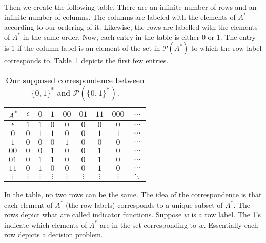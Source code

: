\documentclass{iansnotes}
\begin{document}
  Then we create the following table.
  There are an infinite number of rows and an infinite number of columns.
  The columns are labeled with the elements of $A^*$ according to our ordering of it.
  Likewise, the rows are labelled with the elements of $A^*$ in the same order.
  Now, each entry in the table is either $0$ or $1$.
  The entry is $1$ if the column label is an element of the set in $\mathcal{P}(A^*)$ to which the row label corresponds to.
  Table~\ref{table:diagonal} depicts the first few entries.
  \begin{table}
    \centering 
    \begin{tabular}{c|cccccccc}
      $A^*$      & $\epsilon$ &      $0$ &      $1$ &      $00$ &      $01$ &      $11$ &     $000$ & $\ldots$ \\
      \midrule
      $\epsilon$ &        $1$ &      $1$ &      $0$ &       $0$ &       $0$ &       $0$ &       $0$ & $\ldots$ \\  
      $0$        &        $0$ &      $1$ &      $1$ &       $0$ &       $0$ &       $1$ &       $1$ & $\ldots$ \\  
      $1$        &        $0$ &      $0$ &      $0$ &       $1$ &       $0$ &       $0$ &       $0$ & $\ldots$ \\  
      $00$       &        $0$ &      $0$ &      $1$ &       $0$ &       $0$ &       $1$ &       $0$ & $\ldots$ \\  
      $01$       &        $0$ &      $1$ &      $1$ &       $0$ &       $0$ &       $1$ &       $0$ & $\ldots$ \\  
      $11$       &        $0$ &      $1$ &      $0$ &       $0$ &       $0$ &       $1$ &       $0$ & $\ldots$ \\  
      $\vdots$   &   $\vdots$ & $\vdots$ & $\vdots$ &  $\vdots$ &  $\vdots$ &  $\vdots$ &  $\vdots$ & $\ddots$ \\  
    \end{tabular}
    \caption{Our supposed correspondence between $\{0,1\}^*$ and $\mathcal{P}(\{0,1\}^*)$.}
    \label{table:diagonal}
  \end{table}
  \vspace{12mm}

  In the table, no two rows can be the same.
  The idea of the correspondence is that each element of $A^*$ (the row labels) corresponds to a unique subset of $A^*$.
  The rows depict what are called indicator functions.
  Suppose $w$ is a row label.
  The 1's indicate which elements of $A^*$ are in the set corresponding to $w$.
  Essentially each row depicts a decision problem.
\end{document}
